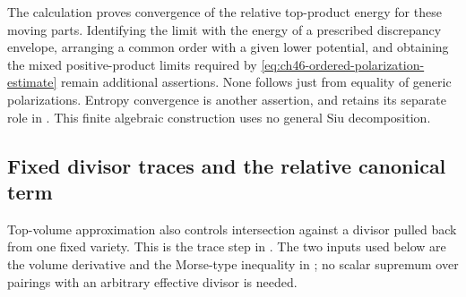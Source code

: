 The calculation proves convergence of the relative top-product
energy for these moving parts. Identifying the limit with the energy
of a prescribed discrepancy envelope, arranging a common order with
a given lower potential, and obtaining the mixed positive-product
limits required by \eqref{eq:ch46-ordered-polarization-estimate}
remain additional assertions. None follows just from equality of
generic polarizations. Entropy convergence is another assertion,
and retains its separate role in .
This finite algebraic construction uses no general Siu decomposition.

\subsection{Fixed divisor traces and the relative canonical term}
\label{sec:ch46-fixed-divisor-traces}

Top-volume approximation also controls intersection against a divisor
pulled back from one fixed variety. This is the trace step in
\cite[Lemma~4.3]{Trusiani26}. The two inputs used below are the volume
derivative and the Morse-type inequality in
\cite[Theorem~A and Proposition~3.3]{BFJ09}; no scalar supremum over
pairings with an arbitrary effective divisor is needed.

